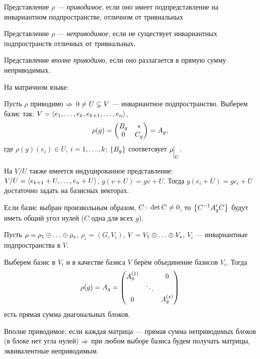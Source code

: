 \begin{df}
	Представление $\rho$ --- \textit{приводимое}, если оно имеет
	подпредставление на инвариантном подпространстве,
	отличном от тривиальных
\end{df}
\begin{df}
	Представление $\rho$ --- \textit{неприводимое}, если не существует
	инвариантных подпространств отличных от тривиальных.
\end{df}
\begin{df}
	Представление \textit{вполне приводимо}, если оно разлагается в прямую сумму неприводимых.
\end{df}

На матричном языке:

Пусть $\rho$ приводимо $\Rightarrow$
$0 \ne U \varsubsetneq V$ --- инвариантное подпространство.
Выберем базис так: $V = \left\langle e_1 ,\ldots, e_k, e_{k + 1} ,\ldots, e_n\right\rangle$,
$$
	\rho(g) = \begin{pmatrix}B_g & * \\ 0 & C_g\end{pmatrix} = A_g,
$$
где $\rho(g)(e_i) \in U$, $i = 1 ,\ldots, k$;
$\left\{B_g\right\}$ соответсвует $\rho\evn{U}$.

На $V/U$ также имеется индуцированное представление:
$V/U = \left\langle e_{k+1} + U ,\ldots, e_n + U\right\rangle$, $g(v + U) = gv + U$.
Тогда $g(e_i + U) = g e_i + U$ достаточно задать на базисных векторах.

Если базис выбран произвольным образом, $C \colon \det C \ne 0$,
то $\left\{C^{-1} A'_g C\right\}$ будут иметь общий угол нулей ($C$ одна для всех $g$).

Пусть $\rho = \rho_1 \sop \rho_s$, $\rho_i = (G, V_i)$, $V = V_1 \sop V_s$,
$V_i$ --- инвариантные подпространства в $V$.

Выберем базис в $V_i$ и в качестве базиса $V$ берём объединение базисов $V_i$.
Тогда
$$
	\rho(g) = A_g = \begin{pmatrix}A^{(1)}_g && 0 \\ & \ddots & \\ 0 && A^{(s)}_g\end{pmatrix}
$$
есть прямая сумма диагональных блоков.

Вполне приводимое, если каждая матрица ---
прямая сумма неприводимых блоков (в блоке нет угла нулей) $\Rightarrow$
при любом выборе базиса будем получать матрицы, эквивалентные неприводимым.

